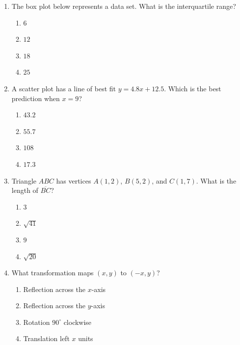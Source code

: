 \documentclass[11pt]{article}
\begin{document}
\begin{enumerate}
\item The box plot below represents a data set. What is the interquartile range?
\begin{center}
\end{center}
\begin{enumerate}[label=(\Alph*)]
\item $6$ \item $12$ \item $18$ \item $25$
\end{enumerate}

\item A scatter plot has a line of best fit $y=4.8x+12.5$. Which is the best prediction when $x=9$?
\begin{enumerate}[label=(\Alph*)]
\item $43.2$ \item $55.7$ \item $108$ \item $17.3$
\end{enumerate}

\item Triangle $ABC$ has vertices $A(1,2)$, $B(5,2)$, and $C(1,7)$. What is the length of $\overline{BC}$?
\begin{enumerate}[label=(\Alph*)]
\item $3$ \item $\sqrt{41}$ \item $9$ \item $\sqrt{20}$
\end{enumerate}

\item What transformation maps $(x,y)$ to $(-x,y)$?
\begin{enumerate}[label=(\Alph*)]
\item Reflection across the $x$-axis \item Reflection across the $y$-axis
\item Rotation $90^\circ$ clockwise \item Translation left $x$ units
\end{enumerate}


\end{enumerate}
\end{document}
